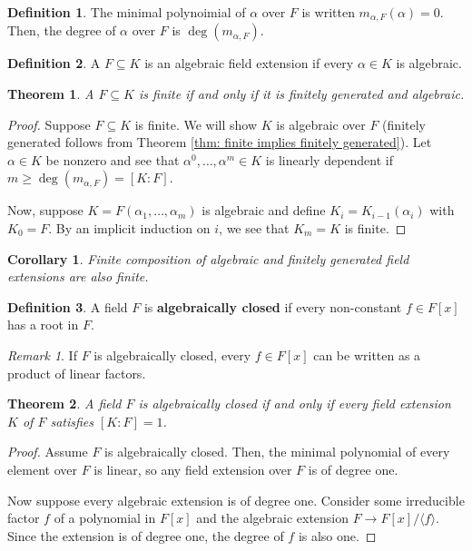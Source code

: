 \documentclass[
    parskip=half,
    toc=flat,
    toc=sectionentrydotfill,
]{scrartcl}  %
\theoremstyle{definition}
\newtheorem{definition}{Definition}[section]
\theoremstyle{plain}
\newtheorem{theorem}{Theorem}[section]
\newtheorem{corollary}{Corollary}[theorem]
\theoremstyle{remark}
\newtheorem{remark}{Remark}[section]
\begin{document}
\begin{definition}
    The minimal polynoimial of $\alpha$ over $F$ is written $m_{\alpha,F}(\alpha)=0$.
    Then, the degree of $\alpha$ over $F$ is $\deg(m_{\alpha,F})$.
\end{definition}

\begin{definition}
    A $F\subseteq K$ is an algebraic field extension if every $\alpha\in K$ is algebraic.
\end{definition}

\begin{theorem}
    A $F\subseteq K$ is finite if and only if it is finitely generated and algebraic.
\end{theorem}

\begin{proof}
    Suppose $F\subseteq K$ is finite.
    We will show $K$ is algebraic over $F$ (finitely generated follows from
    Theorem \ref{thm: finite implies finitely generated}).
    Let $\alpha\in K$ be nonzero and see that $\alpha^0,\dots,\alpha^m\in K$ is
    linearly dependent if $m\geq\deg(m_{\alpha,F})=[K:F]$.

    Now, suppose $K=F(\alpha_1,\dots,\alpha_m)$ is algebraic and define
    $K_i=K_{i-1}(\alpha_i)$ with $K_0=F$.
    By an implicit induction on $i$, we see that $K_m=K$ is finite.
\end{proof}

\begin{corollary}
    Finite composition of algebraic and finitely generated field extensions
    are also finite.
\end{corollary}

\begin{definition}
    A field $F$ is \textbf{algebraically closed} if every non-constant
    $f\in F[x]$ has a root in $F$.
\end{definition}

\begin{remark}
    If $F$ is algebraically closed, every $f\in F[x]$ can be written as a
    product of linear factors.
\end{remark}

\begin{theorem}
    A field $F$ is algebraically closed if and only if every field extension
    $K$ of $F$ satisfies $[K:F]=1$.
\end{theorem}

\begin{proof}
    Assume $F$ is algebraically closed.
    Then, the minimal polynomial of every element over $F$ is linear, so any
    field extension over $F$ is of degree one.

    Now suppose every algebraic extension is of degree one.
    Consider some irreducible factor $f$ of a polynomial in $F[x]$ and the
    algebraic extension $F\to F[x]/\langle f\rangle$.
    Since the extension is of degree one, the degree of $f$ is also one.
\end{proof}
\end{document}
